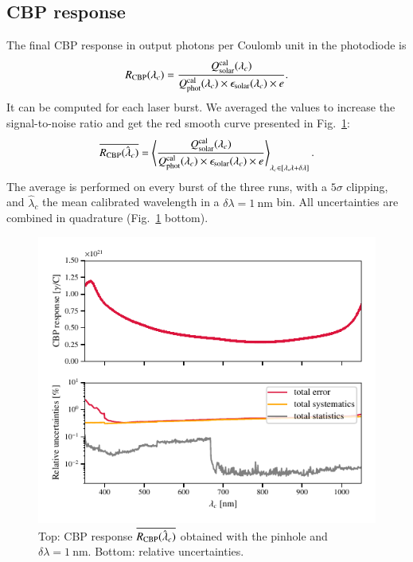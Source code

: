 \subsection{CBP response}

The final CBP response in output photons per Coulomb unit in the photodiode is
\begin{equation}
    R_{\mathrm{CBP}}(\lambda_c) = \frac{Q_{\mathrm{solar}}^{\mathrm{cal}}(\lambda_c)}{Q_{\mathrm{phot}}^{\mathrm{cal}}(\lambda_c) \times \epsilon_{\mathrm{solar}}(\lambda_c) \times e}.
    \label{eq:rcbp2}
\end{equation} 
It can be computed for each laser burst. We averaged the values to increase the signal-to-noise ratio and get the red smooth curve presented in Fig.~\ref{fig:cbp_response}:
\begin{equation}
    \overline{R_{\mathrm{CBP}}(\hat{\lambda}_c)} = \left\langle\frac{Q_{\mathrm{solar}}^{\mathrm{cal}}(\lambda_c)}{Q_{\mathrm{phot}}^{\mathrm{cal}}(\lambda_c) \times \epsilon_{\mathrm{solar}}(\lambda_c) \times e}\right\rangle_{\lambda_c\in [\lambda,\lambda+\delta \lambda]}.
    \label{eq:rcbp3}
\end{equation} 
The average is performed on every burst of the three runs, with a $5\sigma$ clipping, and $\hat{\lambda}_c$ the mean calibrated wavelength in a $\delta \lambda = \SI{1}{\nano\meter}$ bin. All uncertainties are combined in quadrature (Fig.~\ref{fig:cbp_response} bottom).



\begin{figure}%
    \centering
    \includegraphics[width=\columnwidth]{fig/cbp_response.pdf}
    \caption{Top: CBP response $\overline{R_{\mathrm{CBP}}(\hat{\lambda}_c)}$ obtained with the \bpinhole{} pinhole and $\delta \lambda = \SI{1}{\nano\meter}$. Bottom: relative uncertainties.}
    \label{fig:cbp_response}
\end{figure}
